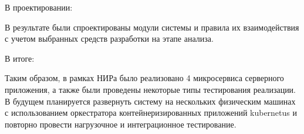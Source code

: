 В проектировании:


В результате были спроектированы модули системы и правила их взаимодействия с учетом выбранных средств разработки
на этапе анализа.


В итоге:


Таким образом, в рамках НИРа было реализовано 4 микросервиса серверного приложения, а также были проведены некоторые типы тестирования реализации. 
В будущем планируется развернуть систему на нескольких физическим машинах с использованием оркестратора контейнеризированных приложений 
kubernetus и повторно провести нагрузочное и интеграционное тестирование.

